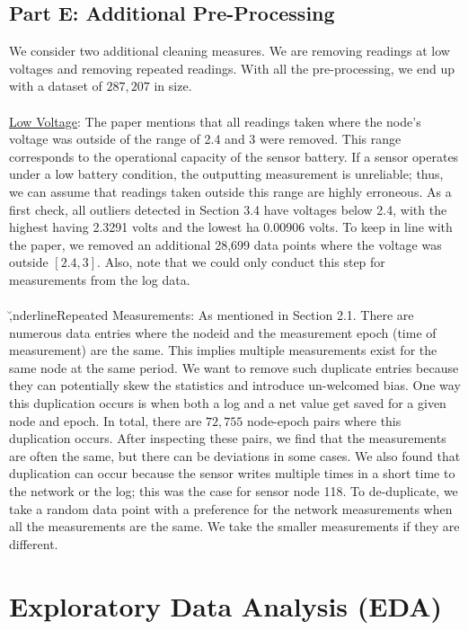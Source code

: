 \documentclass[11pt, letterpaper]{article}
\begin{document}
\subsection{Part E: Additional Pre-Processing}
We consider two additional cleaning measures. We are removing readings at low voltages and removing repeated readings. With all the pre-processing, we end up with a dataset of $287,207$ in size.
\\ \\
\underline{Low Voltage}: The paper mentions that all readings taken where the node's voltage was outside of the range of 2.4 and 3 were removed. This range corresponds to the operational capacity of the sensor battery. If a sensor operates under a low battery condition, the outputting measurement is unreliable; thus, we can assume that readings taken outside this range are highly erroneous. As a first check, all outliers detected in Section 3.4 have voltages below 2.4, with the highest having 2.3291 volts and the lowest ha 0.00906 volts. To keep in line with the paper, we removed an additional 28,699 data points where the voltage was outside $[2.4, 3]$. Also, note that we could only conduct this step for measurements from the log data.
\\ \\
\u,nderline{Repeated Measurements}: As mentioned in Section 2.1. There are numerous data entries where the nodeid and the measurement epoch (time of measurement) are the same. This implies multiple measurements exist for the same node at the same period. We want to remove such duplicate entries because they can potentially skew the statistics and introduce un-welcomed bias. One way this duplication occurs is when both a log and a net value get saved for a given node and epoch. In total, there are $72,755$ node-epoch pairs where this duplication occurs. After inspecting these pairs, we find that the measurements are often the same, but there can be deviations in some cases. We also found that duplication can occur because the sensor writes multiple times in a short time to the network or the log; this was the case for sensor node 118. To de-duplicate, we take a random data point with a preference for the network measurements when all the measurements are the same. We take the smaller measurements if they are different. 


\section{Exploratory Data Analysis (EDA)}
\end{document}
